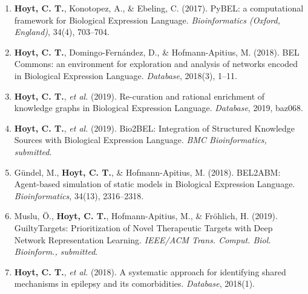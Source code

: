 \begin{enumerate}
    \item \textbf{Hoyt, C. T.}, Konotopez, A., \& Ebeling, C. (2017). PyBEL: a computational framework for Biological Expression Language. \textit{Bioinformatics (Oxford, England)}, 34(4), 703–704.
    \item \textbf{Hoyt, C. T.}, Domingo-Fern\'{a}ndez, D., \& Hofmann-Apitius, M. (2018). BEL Commons: an environment for exploration and analysis of networks encoded in Biological Expression Language. \textit{Database}, 2018(3), 1–11.
    \item \textbf{Hoyt, C. T.}, \textit{et al.} (2019). Re-curation and rational enrichment of knowledge graphs in Biological Expression Language. \textit{Database}, 2019, baz068.
    \item \textbf{Hoyt, C. T.}, \textit{et al.} (2019). Bio2BEL: Integration of Structured Knowledge Sources with Biological Expression Language. \textit{BMC Bioinformatics, submitted}.
    \item Gündel, M., \textbf{Hoyt, C. T.}, \& Hofmann-Apitius, M. (2018). BEL2ABM: Agent-based simulation of static models in Biological Expression Language. \textit{Bioinformatics}, 34(13), 2316–2318.
    \item Muslu, Ö., \textbf{Hoyt, C. T.}, Hofmann-Apitius, M., \& Fröhlich, H. (2019). GuiltyTargets: Prioritization of Novel Therapeutic Targets with Deep Network Representation Learning. \textit{IEEE/ACM Trans. Comput. Biol. Bioinform., submitted}.
    \item \textbf{Hoyt, C. T.}, \textit{et al.} (2018). A systematic approach for identifying shared mechanisms in epilepsy and its comorbidities. \textit{Database}, 2018(1).
\end{enumerate}